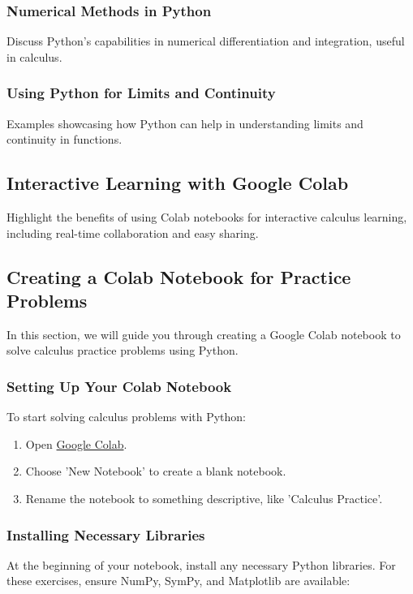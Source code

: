 \documentclass[a4paper,12pt]{book}
\newcounter{problem}
\begin{document}
\subsubsection*{Numerical Methods in Python}
Discuss Python's capabilities in numerical differentiation and integration, useful in calculus.

\subsubsection*{Using Python for Limits and Continuity}
Examples showcasing how Python can help in understanding limits and continuity in functions.

\subsection*{Interactive Learning with Google Colab}
Highlight the benefits of using Colab notebooks for interactive calculus learning, including real-time collaboration and easy sharing.


\subsection*{Creating a Colab Notebook for Practice Problems}

In this section, we will guide you through creating a Google Colab notebook to solve calculus practice problems using Python.

\subsubsection*{Setting Up Your Colab Notebook}
To start solving calculus problems with Python:

\begin{enumerate}
    \item Open \href{https://colab.research.google.com/}{Google Colab}.
    \item Choose 'New Notebook' to create a blank notebook.
    \item Rename the notebook to something descriptive, like 'Calculus Practice'.
\end{enumerate}

\subsubsection*{Installing Necessary Libraries}
At the beginning of your notebook, install any necessary Python libraries. For these exercises, ensure NumPy, SymPy, and Matplotlib are available:
\end{document}
